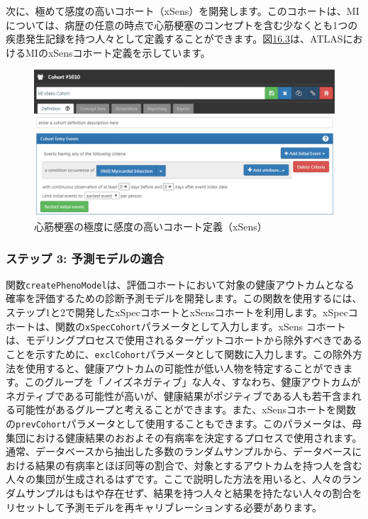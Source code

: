 \documentclass[
  11pt]{book}
\theoremstyle{definition}
\theoremstyle{definition}
\theoremstyle{definition}
\theoremstyle{definition}
\theoremstyle{remark}
\begin{document}
次に、極めて感度の高いコホート（xSens）を開発します。このコホートは、MIについては、病歴の任意の時点で心筋梗塞のコンセプトを含む少なくとも1つの疾患発生記録を持つ人々として定義することができます。図\href{https://ohdsi.github.io/TheBookOfOhdsi/ClinicalValidity.html\#fig:xSens}{16.3}は、ATLASにおけるMIのxSensコホート定義を示しています。

\begin{figure}

{\centering \includegraphics[width=1\linewidth]{images/ClinicalValidity/xSens} 

}

\caption{心筋梗塞の極度に感度の高いコホート定義（xSens）}\label{fig:xSens}
\end{figure}

\subsubsection*{ステップ 3: 予測モデルの適合}\label{ux30b9ux30c6ux30c3ux30d7-3-ux4e88ux6e2cux30e2ux30c7ux30ebux306eux9069ux5408}

関数\texttt{createPhenoModel}は、評価コホートにおいて対象の健康アウトカムとなる確率を評価するための診断予測モデルを開発します。この関数を使用するには、ステップ1と2で開発したxSpecコホートとxSensコホートを利用します。xSpecコホートは、関数の\texttt{xSpecCohort}パラメータとして入力します。xSens コホートは、モデリングプロセスで使用されるターゲットコホートから除外すべきであることを示すために、\texttt{exclCohort}パラメータとして関数に入力します。この除外方法を使用すると、健康アウトカムの可能性が低い人物を特定することができます。このグループを「ノイズネガティブ」な人々、すなわち、健康アウトカムがネガティブである可能性が高いが、健康結果がポジティブである人も若干含まれる可能性があるグループと考えることができます。また、xSensコホートを関数の\texttt{prevCohort}パラメータとして使用することもできます。このパラメータは、母集団における健康結果のおおよその有病率を決定するプロセスで使用されます。通常、データベースから抽出した多数のランダムサンプルから、データベースにおける結果の有病率とほぼ同等の割合で、対象とするアウトカムを持つ人を含む人々の集団が生成されるはずです。ここで説明した方法を用いると、人々のランダムサンプルはもはや存在せず、結果を持つ人々と結果を持たない人々の割合をリセットして予測モデルを再キャリブレーションする必要があります。
\end{document}
